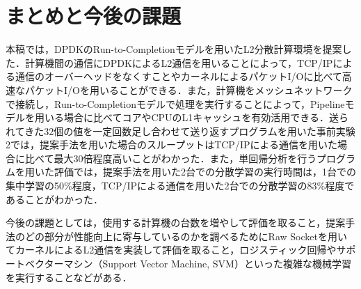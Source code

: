 \section{まとめと今後の課題}
\label{sec:Conclusion}
本稿では，DPDKのRun-to-Completionモデルを用いたL2分散計算環境を提案した．計算機間の通信にDPDKによるL2通信を用いることによって，TCP/IPによる通信のオーバーヘッドをなくすことやカーネルによるパケットI/Oに比べて高速なパケットI/Oを用いることができる．また，計算機をメッシュネットワークで接続し，Run-to-Completionモデルで処理を実行することによって，Pipelineモデルを用いる場合に比べてコアやCPUのL1キャッシュを有効活用できる．送られてきた32個の値を一定回数足し合わせて送り返すプログラムを用いた事前実験2では，提案手法を用いた場合のスループットはTCP/IPによる通信を用いた場合に比べて最大30倍程度高いことがわかった．また，単回帰分析を行うプログラムを用いた評価では，提案手法を用いた2台での分散学習の実行時間は，1台での集中学習の50\%程度，TCP/IPによる通信を用いた2台での分散学習の83\%程度であることがわかった．

今後の課題としては，使用する計算機の台数を増やして評価を取ること，提案手法のどの部分が性能向上に寄与しているのかを調べるためにRaw Socketを用いてカーネルによるL2通信を実装して評価を取ること，ロジスティック回帰やサポートベクターマシン（Support Vector Machine, SVM）といった複雑な機械学習を実行することなどがある．
